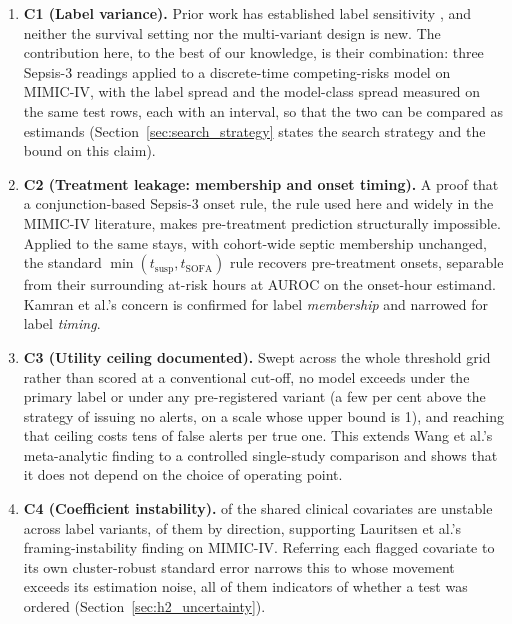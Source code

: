\begin{enumerate}
    \item \textbf{C1 (Label variance).} Prior work has established label
    sensitivity \cite{cohen2024subtle, dutta2026performance}, and neither the
    survival setting nor the multi-variant design is new. The contribution here,
    to the best of our knowledge, is their combination: three Sepsis-3 readings
    applied to a discrete-time competing-risks model on MIMIC-IV, with the label
    spread and the model-class spread measured on the same test rows, each with
    an interval, so that the two can be compared as estimands
    (Section~\ref{sec:search_strategy} states the search strategy and the bound
    on this claim).

    \item \textbf{C2 (Treatment leakage: membership and onset timing).} A
    proof that a conjunction-based Sepsis-3 onset rule, the rule used here and
    widely in the MIMIC-IV literature, makes pre-treatment prediction
    structurally impossible. Applied to the same stays, with cohort-wide septic
    membership unchanged, the standard $\min(t_{\text{susp}}, t_{\text{SOFA}})$
    rule recovers \pcPreTreatOnsetsVarF{} pre-treatment onsets, separable from
    their surrounding at-risk hours at \pcPreTreatAurocPrimaryF{} AUROC on the
    onset-hour estimand. Kamran et al.'s \cite{kamran2024evaluation} concern is
    confirmed for label \emph{membership} and narrowed for label
    \emph{timing}.

    \item \textbf{C3 (Utility ceiling documented).} Swept across the whole
    threshold grid rather than scored at a conventional cut-off, no model
    exceeds \pcUtilityMaxGbtB{} under the primary label or
    \pcUtilityMaxGbtC{} under any pre-registered variant (a few per cent
    above the strategy of issuing no alerts, on a scale whose upper bound is
    1), and reaching that ceiling costs tens of false alerts per true one. This
    extends Wang et al.'s \cite{wang2025srpm} meta-analytic finding to a
    controlled single-study comparison and shows that it does not depend on the
    choice of operating point.

    \item \textbf{C4 (Coefficient instability).} \pcHTwoEst{} of the
    \pcHTwoNTerms{} shared clinical covariates are unstable across label
    variants, \pcHTwoNSign{} of them by direction, supporting Lauritsen et
    al.'s \cite{lauritsen2021framing} framing-instability finding on MIMIC-IV.
    Referring each flagged covariate to its own cluster-robust standard error
    narrows this to \pcHTwoNRobust{} whose movement exceeds its estimation
    noise, all of them indicators of whether a test was ordered
    (Section~\ref{sec:h2_uncertainty}).


\end{enumerate}
